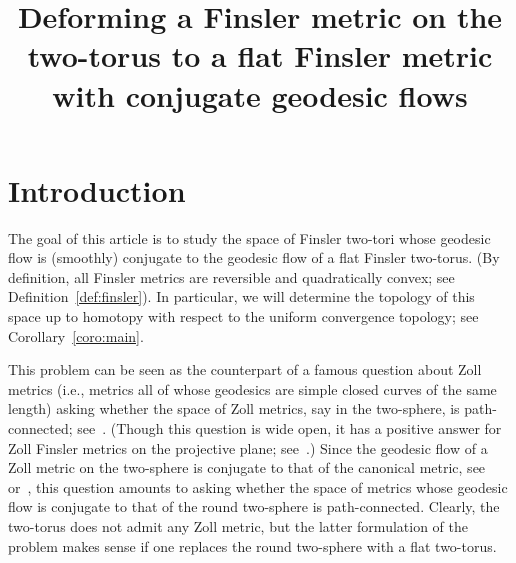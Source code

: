 \documentclass[AHL,Unicode,longabstracts,published]{cedram}
\title[Deforming Finsler two-tori]{Deforming a Finsler metric on the two-torus to a flat Finsler metric with conjugate geodesic flows}
\author[\initial{E.} \lastname{Nakhlé}]{\firstname{Elie} \lastname{Nakhlé}}
\author[\initial{S.} \lastname{Sabourau}]{\firstname{Stéphane} \lastname{Sabourau}}
\newcommand{\ie}{i.e.}
\begin{document}
\maketitle

\section{Introduction}

The goal of this article is to study the space of Finsler two-tori whose geodesic flow is (smoothly) conjugate to the geodesic flow of a flat Finsler two-torus. (By definition, all Finsler metrics are reversible and quadratically convex; see Definition~\ref{def:finsler}). In particular, we will determine the topology of this space up to homotopy with respect to the uniform convergence topology; see Corollary~\ref{coro:main}.


This problem can be seen as the counterpart of a famous question about Zoll metrics (\ie, metrics all of whose geodesics are simple closed curves of the same length) asking whether the space of Zoll metrics, say in the two-sphere, is path-connected; see~\cite[Question~200]{B03}. (Though this question is wide open, it has a positive answer for Zoll Finsler metrics on the projective plane; see~\cite{Sa19}.) Since the geodesic flow of a Zoll metric on the two-sphere is conjugate to that of the canonical metric, see~\cite[\S~4F]{Be78} or~\cite{ABHS17}, this question amounts to asking whether the space of metrics whose geodesic flow is conjugate to that of the round two-sphere is path-connected. Clearly, the two-torus does not admit any Zoll metric, but the latter formulation of the problem makes sense if one replaces the round two-sphere with a flat two-torus.
\end{document}
